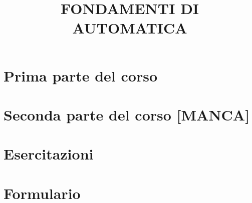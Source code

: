 \documentclass[a4paper, 9pt]{article}
\title{FONDAMENTI DI AUTOMATICA}
\begin{document}
    \maketitle
    \tableofcontents{}
    \newpage
    \part{Prima parte del corso}
    
    
    
    
    
    
    
    
    
    
    
    \newpage
    \part{Seconda parte del corso [MANCA]}
    
    
    
    
    
    
    
    
    
    
    
    
    
    
    
    
    
    
    
    
    
    
    \newpage
    \part{Esercitazioni}
    
    
    
    
    
    
    
    \newpage
    \part{Formulario}
    
\end{document}
